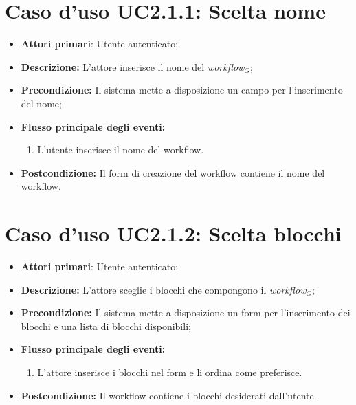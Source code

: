 		\section{Caso d'uso UC2.1.1: Scelta nome }
		\begin{itemize}
			\item \textbf{Attori primari}: Utente autenticato;
			\item \textbf{Descrizione:} L'attore inserisce il nome del \textit{workflow$_{G}$};
			\item \textbf{Precondizione:} Il sistema mette a disposizione un campo per l'inserimento del nome;
			\item \textbf{Flusso principale degli eventi:}
			\begin{enumerate}
				\item L'utente inserisce il nome del workflow.
			\end{enumerate}
			\item \textbf{Postcondizione:} Il form di creazione del workflow contiene il nome del workflow.
		\end{itemize}
		\section{Caso d'uso UC2.1.2: Scelta blocchi }
		\begin{itemize}
			\item \textbf{Attori primari}: Utente autenticato;
			\item \textbf{Descrizione:} L'attore sceglie i blocchi che compongono il \textit{workflow$_{G}$};
			\item \textbf{Precondizione:} Il sistema mette a disposizione un form per l'inserimento dei blocchi e una lista di blocchi disponibili;
			\item \textbf{Flusso principale degli eventi:}
			\begin{enumerate}
				\item L'attore inserisce i blocchi nel form e li ordina come preferisce.
			\end{enumerate}
			\item \textbf{Postcondizione:} Il workflow contiene i blocchi desiderati dall'utente.
		\end{itemize}
